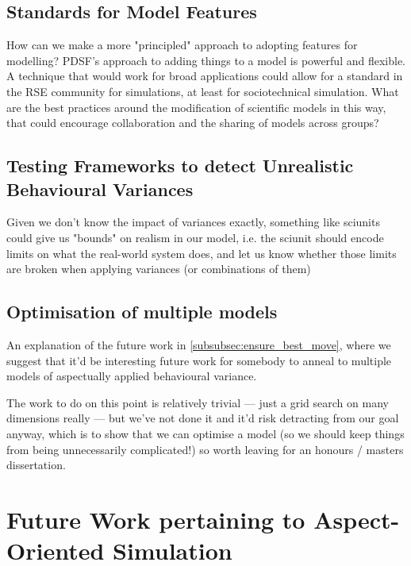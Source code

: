 \subsection{Standards for Model Features}\label{subsec:standard_aosm_techniques}

How can we make a more "principled" approach to adopting features for modelling?
PDSF's approach to adding things to a model is powerful and flexible. A
technique that would work for broad applications could allow for a standard in
the RSE community for simulations, at least for sociotechnical simulation. What
are the best practices around the modification of scientific models in this way,
that could encourage collaboration and the sharing of models across groups?


\subsection{Testing Frameworks to detect Unrealistic Behavioural Variances}\label{sciunits_for_unrealistic_states}

Given we don't know the impact of variances exactly, something like sciunits
could give us "bounds" on realism in our model, i.e. the sciunit should encode
limits on what the real-world system does, and let us know whether those limits
are broken when applying variances (or combinations of them)


\subsection{Optimisation of multiple models}\label{many_aspectual_models_to_optimise}

An explanation of the future work in \cref{subsubsec:ensure_best_move}, where we
suggest that it'd be interesting future work for somebody to anneal to multiple
models of aspectually applied behavioural variance. 

The work to do on this point is relatively trivial --- just a grid search on
many dimensions really --- but we've not done it and it'd risk detracting from
our goal anyway, which is to show that we can optimise a model (so we should
keep things from being unnecessarily complicated!) so worth leaving for an
honours / masters dissertation.



\section{Future Work pertaining to Aspect-Oriented Simulation}\label{sec:future_work_simulations}

